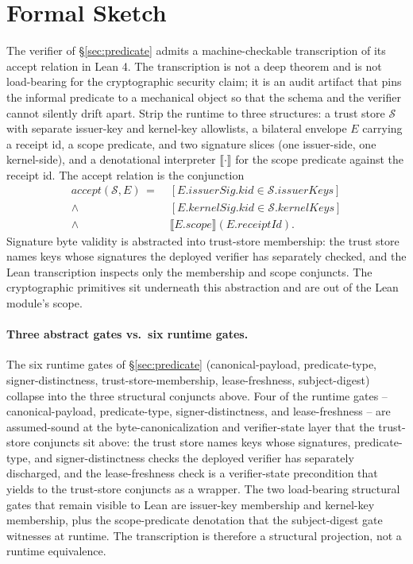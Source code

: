 \section{Formal Sketch}
\label{sec:formal}

The verifier of \S\ref{sec:predicate} admits a machine-checkable transcription of its accept relation in Lean 4. The transcription is not a deep theorem and is not load-bearing for the cryptographic security claim; it is an audit artifact that pins the informal predicate to a mechanical object so that the schema and the verifier cannot silently drift apart. Strip the runtime to three structures: a trust store $\mathcal{S}$ with separate issuer-key and kernel-key allowlists, a bilateral envelope $E$ carrying a receipt id, a scope predicate, and two signature slices (one issuer-side, one kernel-side), and a denotational interpreter $\llbracket\cdot\rrbracket$ for the scope predicate against the receipt id. The accept relation is the conjunction
\begin{align*}
  \mathit{accept}(\mathcal{S},E) \,=\;
    & [E.\mathit{issuerSig}.\mathit{kid} \in \mathcal{S}.\mathit{issuerKeys}] \\
    {}\wedge{} & [E.\mathit{kernelSig}.\mathit{kid} \in \mathcal{S}.\mathit{kernelKeys}] \\
    {}\wedge{} & \llbracket E.\mathit{scope}\rrbracket(E.\mathit{receiptId}).
\end{align*}
Signature byte validity is abstracted into trust-store membership: the trust store names keys whose signatures the deployed verifier has separately checked, and the Lean transcription inspects only the membership and scope conjuncts. The cryptographic primitives sit underneath this abstraction and are out of the Lean module's scope.

\paragraph{Three abstract gates vs.\ six runtime gates.} The six runtime gates of \S\ref{sec:predicate} (canonical-payload, predicate-type, signer-distinctness, trust-store-membership, lease-freshness, subject-digest) collapse into the three structural conjuncts above. Four of the runtime gates -- canonical-payload, predicate-type, signer-distinctness, and lease-freshness -- are assumed-sound at the byte-canonicalization and verifier-state layer that the trust-store conjuncts sit above: the trust store names keys whose signatures, predicate-type, and signer-distinctness checks the deployed verifier has separately discharged, and the lease-freshness check is a verifier-state precondition that yields to the trust-store conjuncts as a wrapper. The two load-bearing structural gates that remain visible to Lean are issuer-key membership and kernel-key membership, plus the scope-predicate denotation that the subject-digest gate witnesses at runtime. The transcription is therefore a structural projection, not a runtime equivalence.

